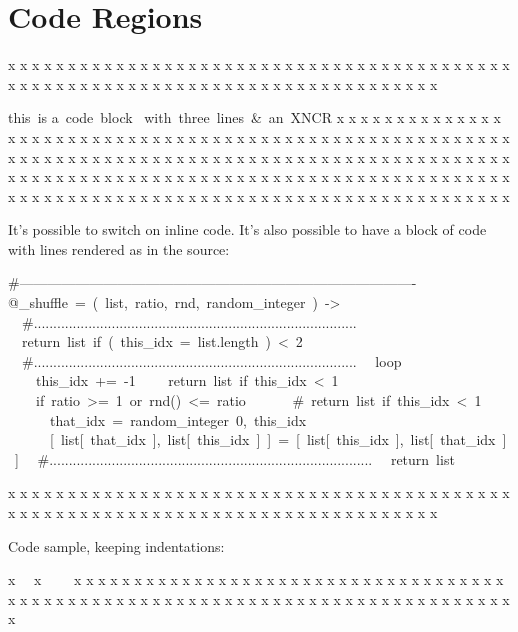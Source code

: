 \section{Code Regions
}
\begin{multicols}{2}x x x x x x x x x x x x x x x x x x x x x x x x x x
x x x x x x x x x x x x x x x x x x x x x x x x x x
x x x x x x x x x x x x x x x x x x x x x x x x x x\mktsShowpar\par
\begingroup\obeyalllines\mktsStyleCode{}this is
a code block 
with three lines \& an XNCR
\endgroup{}x x x x x x x x x x x x x x x x x x x x x x x x x x
x x x x x x x x x x x x x x x x x x x x x x x x x x
x x x x x x x x x x x x x x x x x x x x x x x x x x
x x x x x x x x x x x x x x x x x x x x x x x x x x
x x x x x x x x x x x x x x x x x x x x x x x x x x
x x x x x x x x x x x x x x x x x x x x x x x x x x
x x x x x x x x x x x x x x x x x x x x x x x x x x\mktsShowpar\par
It’s possible to switch on {\mktsStyleCode{}inline code}. It’s also possible
to have a block of code with lines rendered as in the source:
\mktsShowpar\par
\end{multicols}\mktsShowpar\par
\begingroup\obeyalllines\mktsStyleCode{}\#-------------------------------------------------------------------------------------
@\_shuffle = ( list, ratio, rnd, random\_integer ) ->
  \#...................................................................................
  return list if ( this\_idx = list.length ) < 2
  \#...................................................................................
  loop
    this\_idx += -1
    return list if this\_idx < 1
    if ratio >= 1 or rnd() <= ratio
      \# return list if this\_idx < 1
      that\_idx = random\_integer 0, this\_idx
      [ list[ that\_idx ], list[ this\_idx ] ] = [ list[ this\_idx ], list[ that\_idx ] ]
  \#...................................................................................
  return list
\endgroup{}\begin{multicols}{2}x x x x x x x x x x x x x x x x x x x x x x x x x x
x x x x x x x x x x x x x x x x x x x x x x x x x x
x x x x x x x x x x x x x x x x x x x x x x x x x x\mktsShowpar\par
Code sample, keeping indentations:\mktsShowpar\par
\begingroup\obeyalllines\mktsStyleCode{}x
  x
    x
\endgroup{}x x x x x x x x x x x x x x x x x x x x x x x x x x
x x x x x x x x x x x x x x x x x x x x x x x x x x
x x x x x x x x x x x x x x x x x x x x x x x x x x\mktsShowpar\par
\end{multicols}
